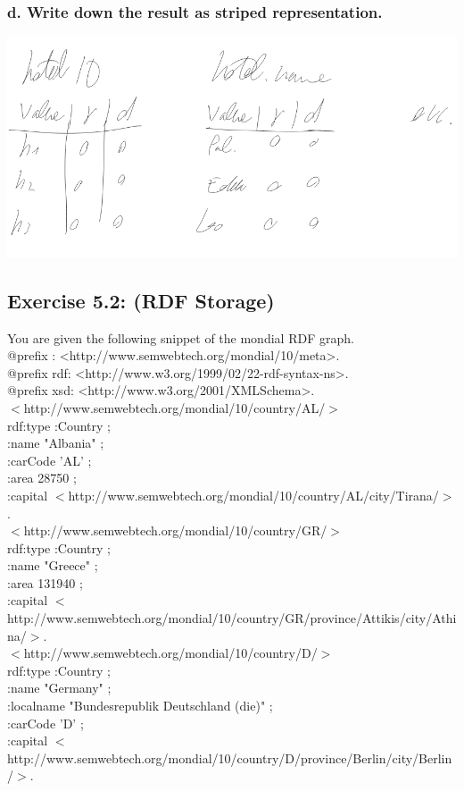 \documentclass{article}
\begin{document}
\subsubsection{d. Write down the result as striped representation.}
\includegraphics[scale=0.4]{5_4.png}

\subsection{Exercise 5.2: (RDF Storage)}
You are given the following snippet of the mondial RDF graph.\\
@prefix : <http://www.semwebtech.org/mondial/10/meta>.\\
@prefix rdf: <http://www.w3.org/1999/02/22-rdf-syntax-ns>.\\
@prefix xsd: <http://www.w3.org/2001/XMLSchema>.\\
$<$http://www.semwebtech.org/mondial/10/country/AL/$>$ \\
		rdf:type :Country ;\\
		:name "Albania" ;\\
		:carCode ’AL’ ;\\
		:area 28750 ;\\
		:capital $<$http://www.semwebtech.org/mondial/10/country/AL/city/Tirana/$>$.\\
$<$http://www.semwebtech.org/mondial/10/country/GR/$>$ \\
		rdf:type :Country ;\\
		:name "Greece" ;\\
		:area 131940 ;\\
		:capital $<$http://www.semwebtech.org/mondial/10/country/GR/province/Attikis/city/Athina/$>$.\\
$<$http://www.semwebtech.org/mondial/10/country/D/$>$ \\
		rdf:type :Country ;\\
		:name "Germany" ;\\
		:localname "Bundesrepublik Deutschland (die)" ;\\
		:carCode ’D’ ;\\
		:capital $<$http://www.semwebtech.org/mondial/10/country/D/province/Berlin/city/Berlin/$>$.
\end{document}
